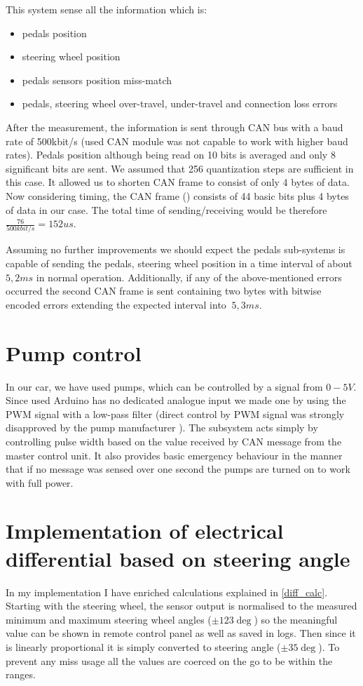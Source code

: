 This system sense all the information which is:
\begin{itemize}
    \item pedals position
    \item steering wheel position
    \item pedals sensors position miss-match
    \item pedals, steering wheel over-travel, under-travel and connection loss errors
\end{itemize}

After the measurement, the information is sent through CAN bus with a baud rate of 500kbit/s (used CAN module was not capable to work with higher baud rates). Pedals position although being read on 10 bits is averaged and only 8 significant bits are sent. We assumed that 256 quantization steps are sufficient in this case. It allowed us to shorten CAN frame to consist of only 4 bytes of data.
Now considering timing, the CAN frame () consists of 44 basic bits plus 4 bytes of data in our case. The total time of sending/receiving would be therefore $\frac{76}{500kbit/s} = 152us$.

Assuming no further improvements we should expect the pedals sub-systems is capable of sending the pedals, steering wheel position in a time interval of about $5,2ms$\label{pedal_ideal_time} in normal operation.
Additionally, if any of the above-mentioned errors occurred the second CAN frame is sent containing two bytes with bitwise encoded errors extending the expected interval into $~5,3ms$.

\section{Pump control}\label{pump_control}
In our car, we have used  pumps, which can be controlled by a signal from $0-5V$. Since used Arduino has no dedicated analogue input we made one by using the PWM signal with a low-pass filter (direct control by PWM signal was strongly disapproved by the pump manufacturer ).
The subsystem acts simply by controlling pulse width based on the value received by CAN message from the master control unit. It also provides basic emergency behaviour in the manner that if no message was sensed over one second the pumps are turned on to work with full power.






\section{Implementation of electrical differential based on steering angle}\label{diff_meth}
In my implementation I have enriched calculations explained in \ref{diff_calc}. Starting with the steering wheel, the sensor output is normalised to the measured minimum and maximum steering wheel angles ($\pm123\deg$) so the meaningful value can be shown in remote control panel as well as saved in logs. 
Then since it is linearly proportional it is simply converted to steering angle ($\pm35\deg$). To prevent any miss usage all the values are coerced on the go to be within the ranges.

